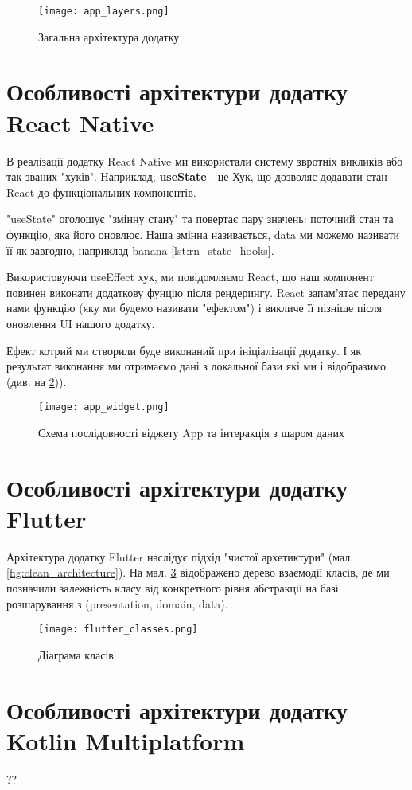 \begin{figure}
    \begin{center}
        \texttt{[image: app\_layers.png]}
        \caption{Загальна архітектура додатку}
        \label{fig:gen_app_architecture}
    \end{center}
\end{figure}

\section{Особливості архітектури додатку React Native}
\label{sec:kn_app_architecture}
В реалізації додатку React Native ми використали систему звротніх викликів або так званих "хуків".
Наприклад, \textbf{useState} - це Хук, що дозволяє додавати стан React до функціональних компонентів.

"useState" оголошує "змінну стану" та повертає пару значень: поточний стан та функцію, яка його оновлює.
Наша змінна називається, data ми можемо називати її як завгодно, наприклад banana \ref{lst:rn_state_hooks}.

Використовуючи useEffect хук, ми повідомляємо React, що наш компонент повинен виконати додаткову фунцію після рендерингу.
React запам'ятає передану нами функцію (яку ми будемо називати "ефектом") і викличе її пізніше після оновлення UI нашого додатку.

Ефект котрий ми створили буде виконаний при ініціалізації додатку. І як результат виконання ми отримаємо дані з локальної бази які ми і відобразимо (див. на \ref{fig:rn_realm})).

\begin{figure}
    \begin{center}
        \texttt{[image: app\_widget.png]}
        \caption{Схема послідовності віджету App та інтеракція з шаром даних}
        \label{fig:rn_realm}
    \end{center}
\end{figure}


\section{Особливості архітектури додатку Flutter}
\label{sec:flutter_network_app}

Архітектура додатку Flutter наслідує підхід "чистої архетиктури" (мал. \ref{fig:clean_architecture}).
На мал. \ref{fig:flutter_classes} відображено дерево взаємодії класів, де ми позначили залежність класу
від конкретного рівня абстракції на базі розшарування з (presentation, domain, data).

\begin{figure}
    \begin{center}
        \texttt{[image: flutter\_classes.png]}
        \caption{Діаграма класів}
        \label{fig:flutter_classes}
    \end{center}
\end{figure}


\section{Особливості архітектури додатку Kotlin Multiplatform}
\label{sec:kmm_architecture}

??
